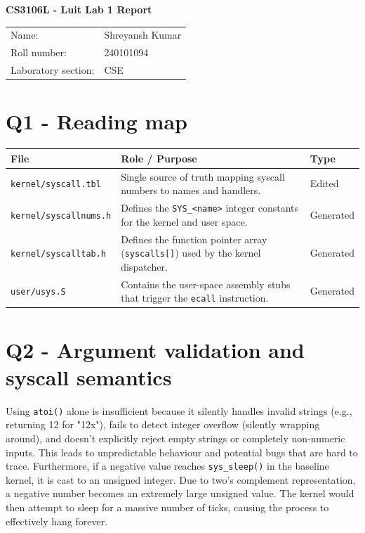 \documentclass[11pt,a4paper]{article}
\begin{document}
\begin{center}
{\Large\bfseries CS3106L - Luit Lab 1 Report}\\[3mm]
\begin{tabularx}{0.9\textwidth}{@{}lX@{}}
Name: & Shreyansh Kumar \\
Roll number: & 240101094 \\
Laboratory section: & CSE \\
\end{tabularx}
\end{center}

\section*{Q1 - Reading map}
\begin{tabularx}{\textwidth}{@{}lXl@{}}
\toprule
\textbf{File} & \textbf{Role / Purpose} & \textbf{Type} \\
\midrule
\texttt{kernel/syscall.tbl} & Single source of truth mapping syscall numbers to names and handlers. & Edited \\
\texttt{kernel/syscallnums.h} & Defines the \texttt{SYS\_<name>} integer constants for the kernel and user space. & Generated \\
\texttt{kernel/syscalltab.h} & Defines the function pointer array (\texttt{syscalls[]}) used by the kernel dispatcher. & Generated \\
\texttt{user/usys.S} & Contains the user-space assembly stubs that trigger the \texttt{ecall} instruction. & Generated \\
\bottomrule
\end{tabularx}

\section*{Q2 - Argument validation and syscall semantics}
Using \texttt{atoi()} alone is insufficient because it silently handles invalid strings (e.g., returning 12 for "12x"), fails to detect integer overflow (silently wrapping around), and doesn't explicitly reject empty strings or completely non-numeric inputs. This leads to unpredictable behaviour and potential bugs that are hard to trace.
Furthermore, if a negative value reaches \texttt{sys\_sleep()} in the baseline kernel, it is cast to an unsigned integer. Due to two's complement representation, a negative number becomes an extremely large unsigned value. The kernel would then attempt to sleep for a massive number of ticks, causing the process to effectively hang forever.
\end{document}
